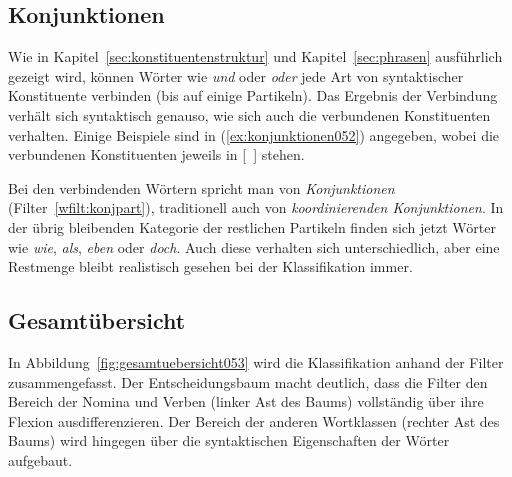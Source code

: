 \subsection{Konjunktionen}
\label{sec:konjunktionen}


Wie in Kapitel~\ref{sec:konstituentenstruktur} und Kapitel~\ref{sec:phrasen} ausführlich gezeigt wird, können Wörter wie \textit{und} oder \textit{oder} jede Art von syntaktischer Konstituente verbinden (bis auf einige Partikeln).
Das Ergebnis der Verbindung verhält sich syntaktisch genauso, wie sich auch die verbundenen Konstituenten verhalten.
Einige Beispiele sind in (\ref{ex:konjunktionen052}) angegeben, wobei die verbundenen Konstituenten jeweils in [~] stehen.

\begin{exe}
  \ex\label{ex:konjunktionen052}
  \begin{xlist}
  \end{xlist}
\end{exe}

Bei den verbindenden Wörtern spricht man von \textit{Konjunktionen} (Filter~\ref{wfilt:konjpart}), traditionell auch von \textit{koordinierenden Konjunktionen}.
In der übrig bleibenden Kategorie der restlichen Partikeln finden sich jetzt Wörter wie \textit{wie}, \textit{als}, \textit{eben} oder \textit{doch}.
Auch diese verhalten sich unterschiedlich, aber eine Restmenge bleibt realistisch gesehen bei der Klassifikation immer.


\subsection{Gesamtübersicht}
\label{sec:gesamtuebersicht}

In Abbildung~\ref{fig:gesamtuebersicht053} wird die Klassifikation anhand der Filter zusammengefasst.
Der Entscheidungsbaum macht deutlich, dass die Filter den Bereich der Nomina und Verben (linker Ast des Baums) vollständig über ihre Flexion ausdifferenzieren.
Der Bereich der anderen Wortklassen (rechter Ast des Baums) wird hingegen über die syntaktischen Eigenschaften der Wörter aufgebaut.

